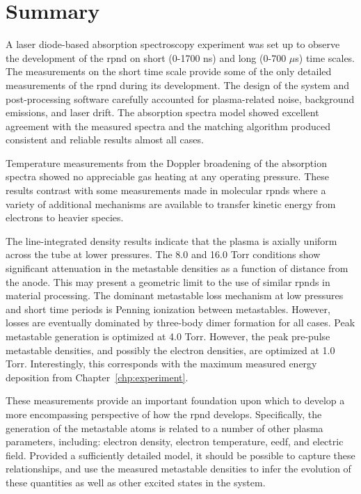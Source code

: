 \section{Summary}
A laser diode-based absorption spectroscopy experiment was set up to observe the
development of the \acs{rpnd} on short (0-1700 ns) and long (0-700 $\mu$s) time
scales. The measurements on the short time scale provide some of the only
detailed measurements of the \acs{rpnd} during its development. The design of
the system and post-processing software carefully accounted for plasma-related
noise, background emissions, and laser drift. The absorption spectra model
showed excellent agreement with the measured spectra and the matching algorithm
produced consistent and reliable results almost all cases.

Temperature measurements from the Doppler broadening of the absorption spectra
showed no appreciable gas heating at any operating pressure. These results
contrast with some measurements made in molecular \acs{rpnd}s where a variety of
additional mechanisms are available to transfer kinetic energy from electrons to
heavier species.

The line-integrated density results indicate that the plasma is axially uniform
across the tube at lower pressures. The 8.0 and 16.0 Torr conditions
show significant attenuation in the metastable densities as a function of
distance from the anode. This may present a geometric limit to the use of
similar \acs{rpnd}s in material processing. The dominant metastable loss
mechanism at low pressures and short time periods is Penning ionization between
metastables. However, losses are eventually dominated by three-body dimer
formation for all cases. Peak metastable generation is optimized at 4.0 Torr.
However, the peak pre-pulse metastable densities, and possibly the electron
densities, are optimized at 1.0 Torr. Interestingly, this corresponds with the
maximum measured energy deposition from Chapter~\ref{chp:experiment}.

These measurements provide an important foundation upon which to develop a more
encompassing perspective of how the \acs{rpnd} develops. Specifically, the
generation of the metastable atoms is related to a number of other plasma
parameters, including: electron density, electron temperature, \acs{eedf}, and
electric field. Provided a sufficiently detailed model, it should be possible to
capture these relationships, and use the measured metastable densities to infer
the evolution of these quantities as well as other excited states in the system.
